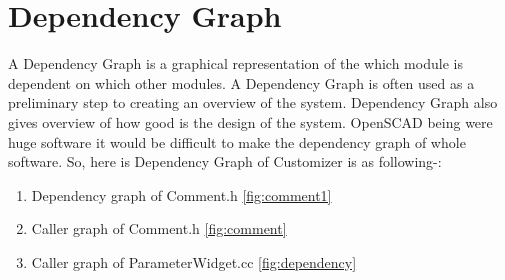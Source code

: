 \section{Dependency Graph}
A Dependency Graph is a graphical representation of the which module is dependent on which other modules. A Dependency Graph is often used as a preliminary step to creating an overview of the system. Dependency Graph also gives overview of how good is the design of the system.
OpenSCAD being were huge software it would be difficult to make the dependency graph of whole software. So, here is  Dependency Graph of Customizer is as following-:
\begin{enumerate}
\item Dependency graph of Comment.h \ref{fig:comment1}
\item Caller graph of Comment.h \ref{fig:comment}
\item Caller graph of ParameterWidget.cc \ref{fig:dependency}
\end{enumerate}

